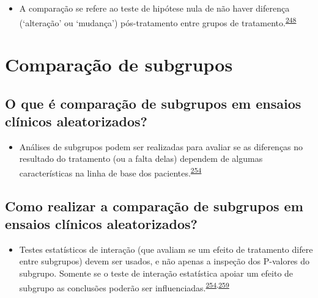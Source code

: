 \documentclass[
  a4paper,
]{book}
\providecommand{\tightlist}{%
  \setlength{\itemsep}{0pt}\setlength{\parskip}{0pt}}
\begin{document}
\begin{itemize}
\tightlist
\item
  A comparação se refere ao teste de hipótese nula de não haver diferença (`alteração' ou `mudança') pós-tratamento entre grupos de tratamento.\textsuperscript{\protect\hyperlink{ref-bland2011}{248}}
\end{itemize}

\hypertarget{comparacao-subgrupos}{%
\section{Comparação de subgrupos}\label{comparacao-subgrupos}}

\hypertarget{o-que-uxe9-comparauxe7uxe3o-de-subgrupos-em-ensaios-cluxednicos-aleatorizados}{%
\subsection{O que é comparação de subgrupos em ensaios clínicos aleatorizados?}\label{o-que-uxe9-comparauxe7uxe3o-de-subgrupos-em-ensaios-cluxednicos-aleatorizados}}

\begin{itemize}
\tightlist
\item
  Análises de subgrupos podem ser realizadas para avaliar se as diferenças no resultado do tratamento (ou a falta delas) dependem de algumas características na linha de base dos pacientes.\textsuperscript{\protect\hyperlink{ref-Assmann2000}{254}}
\end{itemize}

\hypertarget{como-realizar-a-comparauxe7uxe3o-de-subgrupos-em-ensaios-cluxednicos-aleatorizados}{%
\subsection{Como realizar a comparação de subgrupos em ensaios clínicos aleatorizados?}\label{como-realizar-a-comparauxe7uxe3o-de-subgrupos-em-ensaios-cluxednicos-aleatorizados}}

\begin{itemize}
\tightlist
\item
  Testes estatísticos de interação (que avaliam se um efeito de tratamento difere entre subgrupos) devem ser usados, e não apenas a inspeção dos P-valores do subgrupo. Somente se o teste de interação estatística apoiar um efeito de subgrupo as conclusões poderão ser influenciadas.\textsuperscript{\protect\hyperlink{ref-Assmann2000}{254},\protect\hyperlink{ref-Brookes2004}{259}}
\end{itemize}
\end{document}
